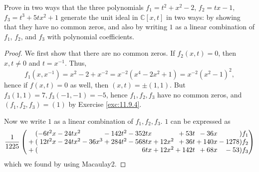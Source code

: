 \documentclass[12pt]{article}
\theoremstyle{remark}
\begin{document}
\begin{problem}
  Prove in two ways that the three polynomials $f_1 = t^2 + x^2 - 2$, $f_2 = tx - 1$, $f_3 = t^3 + 5tx^2 + 1$ generate the unit ideal in $\mathbb{C}[x,t]$ in two ways: by showing that they have no common zeros, and also by writing $1$ as a linear combination of $f_1$, $f_2$, and $f_3$ with polynomial coefficients.
\end{problem}
\begin{proof}
  We first show that there are no common zeros. If $f_2(x,t) = 0$, then $x,t \ne 0$ and $t = x^{-1}$. Thus,
  \begin{equation*}
    f_1(x,x^{-1}) = x^2 - 2 + x^{-2} = x^{-2}(x^4 - 2x^2 + 1) = x^{-2}(x^2 - 1)^2,
  \end{equation*}
  hence if $f(x,t) = 0$ as well, then $(x,t) = \pm(1,1)$. But $f_3(1,1) = 7,f_3(-1,-1) = -5$, hence $f_1,f_2,f_3$ have no common zeros, and $(f_1,f_2,f_3) = (1)$ by Exercise \ref{exc:11.9.4}.
  \par Now we write $1$ as a linear combination of $f_1,f_2,f_3$. $1$ can be expressed as
  \begin{equation*}
    \arraycolsep=0pt
    \frac{1}{1225}
    \left(\begin{array}{*{11}{r}}
      (&-6t^2x &{}-24tx^2 &         &{}-142t^2 &{}-352tx &         &{}+53t &{}-36x  &)f_1\\
      {}+(&12t^2x &{}-24tx^2 &{}-36x^3 &{}+284t^2 &{}-568tx &{}+12x^2 &{}+36t &{}+140x &{}-1278)f_2\\
      {}+(&       &          &         &          &6tx      &{}+12x^2 &{}+142t&{}+68x  &{}-53)f_3
    \end{array}\right)
  \end{equation*}
  which we found by using Macaulay2.
\end{proof}
\end{document}

